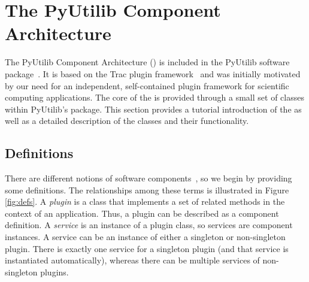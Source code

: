 
\section{The PyUtilib Component Architecture}

\label{chap:pca}

The PyUtilib Component Architecture (\pca) is included in the PyUtilib software
package~\cite{PyUtilib}.  It is based on the Trac
plugin framework~\cite{Trac} and was initially motivated by our need for
an independent, self-contained plugin framework for scientific computing
applications.  
The core
of the \pcasp is provided through a small set of classes within
PyUtilib's  package.  This section
provides a
tutorial introduction of the \pcasp as well as a detailed description
of the \pcasp classes and their functionality.


\subsection{\pcasp Definitions}

There are different notions of software components~\cite{Mar05}, so we begin by
providing some definitions.  The relationships among these terms is
illustrated in Figure \ref{fig:defs}.  A \textit{plugin} is a
class that implements a set of related methods in the context of an
application.  Thus, a plugin can be described as a component definition.
A \textit{service} is an instance of a plugin class, so services are
component instances.  A service can be an instance of either a singleton
or non-singleton plugin. There is exactly one service for a singleton
plugin (and that service is instantiated automatically), whereas there can be multiple services of non-singleton plugins.

